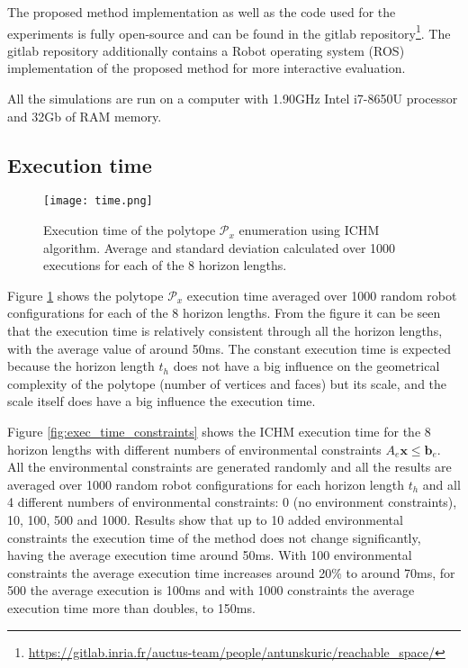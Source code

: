 The proposed method implementation as well as the code used for the experiments is fully open-source and can be found in the gitlab repository\footnote{\url{https://gitlab.inria.fr/auctus-team/people/antunskuric/reachable_space/}}. The gitlab repository additionally contains a Robot operating system (ROS) implementation of the proposed method for more interactive evaluation.

All the simulations are run on a computer with 1.90GHz Intel i7-8650U processor and 32Gb of RAM memory.
 
\vspace{-0.1cm}
\subsection{Execution time}
\vspace{-0.1cm}
\begin{figure}[!t]
    \centering
    \texttt{[image: time.png]}
    \vspace{-0.2cm}
    \caption{Execution time of the polytope $\mathcal{P}_x$ enumeration using ICHM algorithm. Average and standard deviation calculated over 1000 executions for each of the 8 horizon lengths.}
    \label{fig:exec_time}
\vspace{-0.3cm}
\end{figure}

Figure \ref{fig:exec_time} shows the polytope $\mathcal{P}_x$ execution time averaged over 1000 random robot configurations for each of the 8 horizon lengths. From the figure it can be seen that the execution time is relatively consistent through all the horizon lengths, with the average value of around 50ms. The constant execution time is expected because the horizon length $t_h$ does not have a big influence on the geometrical complexity of the polytope (number of vertices and faces) but its scale, and the scale itself does have a big influence the execution time.


Figure \ref{fig:exec_time_constraints} shows the ICHM execution time for the 8 horizon lengths with different numbers of environmental constraints $A_e\bm{x}\!\leq\!\bm{b}_e$. All the environmental constraints are generated randomly and all the results are averaged over 1000 random robot configurations for each horizon length $t_h$ and all 4 different numbers of environmental constraints: 0 (no environment constraints), 10, 100, 500 and 1000. Results show that up to 10 added environmental constraints the execution time of the method does not change significantly, having the average execution time around 50ms. With 100 environmental constraints the average execution time increases around 20\% to around 70ms, for 500 the average execution is 100ms and with 1000 constraints the average execution time more than doubles, to 150ms.   


